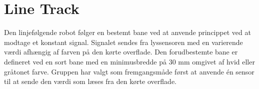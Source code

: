 \section{Line Track}
Den linjefølgende robot følger en bestemt bane ved at anvende princippet ved at modtage et konstant signal. Signalet sendes fra lyssensoren med en varierende værdi afhængig af farven på den kørte overflade. 
\newline
Den forudbestemte bane er defineret ved en sort bane med en minimusbredde på 30 mm omgivet af hvid eller gråtonet farve. 
\newline
Gruppen har valgt som fremgangsmåde først at anvende én sensor til at sende den værdi som læses fra den kørte overflade. 


